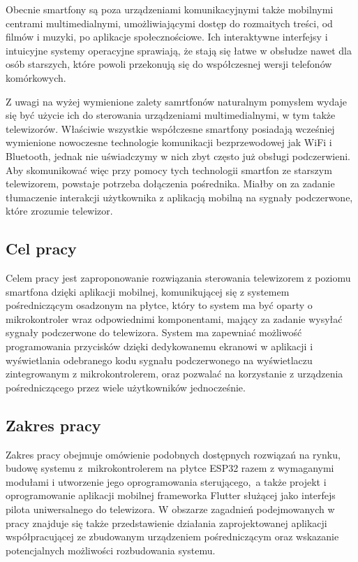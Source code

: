 \documentclass[12pt,twoside]{article}
\begin{document}
Obecnie smartfony są poza urządzeniami komunikacyjnymi także mobilnymi centrami multimedialnymi,
umożliwiającymi dostęp do rozmaitych treści, od filmów i muzyki, po aplikacje społecznościowe.
Ich interaktywne interfejsy i intuicyjne systemy operacyjne sprawiają, że stają się łatwe w obsłudze nawet dla osób starszych,
które powoli przekonują się do współczesnej wersji telefonów komórkowych.

Z uwagi na wyżej wymienione zalety samrtfonów naturalnym pomysłem wydaje się być użycie ich do
sterowania urządzeniami multimedialnymi, w tym także telewizorów. Właściwie wszystkie współczesne smartfony posiadają
wcześniej wymienione nowoczesne technologie komunikacji bezprzewodowej jak WiFi i Bluetooth, jednak nie uświadczymy w nich zbyt często już obsługi podczerwieni. Aby skomunikować więc przy pomocy tych technologii smartfon
ze starszym telewizorem, powstaje potrzeba dołączenia pośrednika. Miałby on za zadanie tłumaczenie interakcji
użytkownika z aplikacją mobilną na sygnały podczerwone, które zrozumie telewizor.

\subsection{Cel pracy}
Celem pracy jest zaproponowanie rozwiązania sterowania telewizorem z poziomu
smartfona dzięki aplikacji mobilnej, komunikującej się z systemem pośredniczącym osadzonym na  płytce, który to system ma być oparty o mikrokontroler wraz odpowiednimi komponentami, mający za zadanie wysyłać sygnały podczerwone do telewizora. System ma zapewniać możliwość programowania przycisków dzięki dedykowanemu ekranowi w aplikacji i
wyświetlania odebranego kodu sygnału podczerwonego na wyświetlaczu zintegrowanym z mikrokontrolerem, oraz pozwalać na korzystanie z urządzenia pośredniczącego przez wiele użytkowników jednocześnie.

\subsection{Zakres pracy}
Zakres pracy obejmuje omówienie podobnych dostępnych rozwiązań na rynku, budowę systemu z~mikrokontrolerem na płytce ESP32 razem z wymaganymi modułami i utworzenie jego oprogramowania sterującego,~a także projekt i oprogramowanie aplikacji
mobilnej frameworka Flutter służącej jako interfejs pilota uniwersalnego do telewizora. W obszarze zagadnień podejmowanych w pracy znajduje się także przedstawienie działania zaprojektowanej aplikacji współpracującej ze zbudowanym urządzeniem pośredniczącym oraz wskazanie potencjalnych możliwości rozbudowania systemu.
\end{document}
